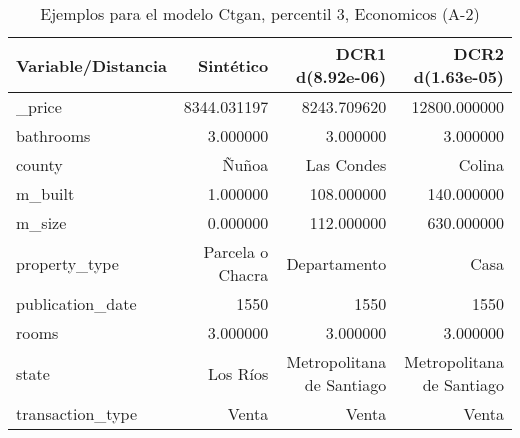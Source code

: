 \begin{table}[H]
\centering
\fontsize{10}{14}\selectfont
\caption{Ejemplos para el modelo Ctgan, percentil 3, Economicos (A-2)}
\label{table-example-economicos-a-2-ctgan-3p}
\begin{tabular}{|l|r|r|r|}
\hline
\rowcolor[gray]{0.8}
Variable/Distancia & Sintético & DCR1 d(8.92e-06) & DCR2 d(1.63e-05) \\
\hline \_price & \cellcolor[rgb]{0.9, 0.54, 0.52} 8344.031197 & 8243.709620 & 12800.000000 \\
\hline bathrooms & \cellcolor[rgb]{0.9, 0.54, 0.52} 3.000000 & \cellcolor[rgb]{0.9, 0.54, 0.52} 3.000000 & \cellcolor[rgb]{0.9, 0.54, 0.52} 3.000000 \\
\hline county & \cellcolor[rgb]{0.9, 0.54, 0.52} Ñuñoa & Las Condes & Colina \\
\hline m\_built & \cellcolor[rgb]{0.9, 0.54, 0.52} 1.000000 & 108.000000 & 140.000000 \\
\hline m\_size & \cellcolor[rgb]{0.9, 0.54, 0.52} 0.000000 & 112.000000 & 630.000000 \\
\hline property\_type & \cellcolor[rgb]{0.9, 0.54, 0.52} Parcela o Chacra & Departamento & Casa \\
\hline publication\_date & \cellcolor[rgb]{0.9, 0.54, 0.52} 1550 & \cellcolor[rgb]{0.9, 0.54, 0.52} 1550 & \cellcolor[rgb]{0.9, 0.54, 0.52} 1550 \\
\hline rooms & \cellcolor[rgb]{0.9, 0.54, 0.52} 3.000000 & \cellcolor[rgb]{0.9, 0.54, 0.52} 3.000000 & \cellcolor[rgb]{0.9, 0.54, 0.52} 3.000000 \\
\hline state & \cellcolor[rgb]{0.9, 0.54, 0.52} Los Ríos & Metropolitana de Santiago & Metropolitana de Santiago \\
\hline transaction\_type & \cellcolor[rgb]{0.9, 0.54, 0.52} Venta & \cellcolor[rgb]{0.9, 0.54, 0.52} Venta & \cellcolor[rgb]{0.9, 0.54, 0.52} Venta \\
\hline
\end{tabular}
\end{table}
